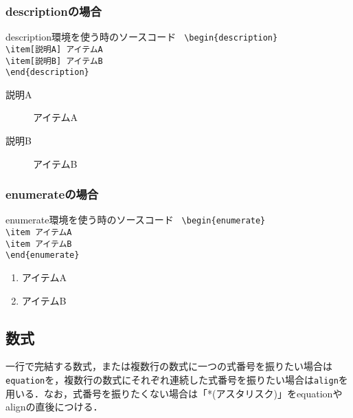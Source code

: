 \subsubsection{descriptionの場合}
\begin{itembox}[c]{description環境を使う時のソースコード}
  \texttt{
    \hspace{-0.5\zw}\textbackslash begin\{description\}\\
    \hspace{2\zw}\textbackslash item[説明A] アイテムA\\
    \hspace{2\zw}\textbackslash item[説明B] アイテムB\\
    \textbackslash end\{description\}
  }
\end{itembox}
\begin{description}
  \item[説明A] アイテムA
  \item[説明B] アイテムB
\end{description}
\subsubsection{enumerateの場合}
\begin{itembox}[c]{enumerate環境を使う時のソースコード}
  \texttt{
    \hspace{-0.5\zw}\textbackslash begin\{enumerate\}\\
    \hspace{2\zw}\textbackslash item アイテムA\\
    \hspace{2\zw}\textbackslash item アイテムB\\
    \textbackslash end\{enumerate\}
  }
\end{itembox}
\begin{enumerate}
  \item アイテムA
  \item アイテムB
\end{enumerate}
\subsection{数式}
一行で完結する数式，または複数行の数式に一つの式番号を振りたい場合は\texttt{equation}を，複数行の数式にそれぞれ連続した式番号を振りたい場合は\texttt{align}を用いる．なお，式番号を振りたくない場合は「*(アスタリスク)」をequationやalignの直後につける．

